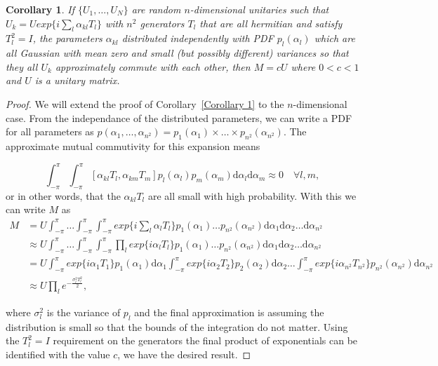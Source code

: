 \documentclass[aps,pra,twocolumn,superscriptaddress,numerical]{revtex4-1}
\newtheorem{corollary}{Corollary}
\begin{document}
\begin{corollary}
\label{Corollary 2}
If $\{U_1,\ldots,U_N\}$ are random $n$-dimensional unitaries such that $U_k = U exp\{i \sum_l \alpha_{kl} T_l\}$ with $n^2$ generators $T_l$ that are all hermitian and satisfy $T_l^2=I$, the parameters $\alpha_{kl}$ distributed independently with PDF $p_{l}(\alpha_l)$ which are all Gaussian with mean zero and small (but possibly different) variances so that they all $U_k$ approximately commute with each other, then $M = c U$ where $0 < c < 1$ and $U$ is a unitary matrix.
\end{corollary}
\begin{proof}
We will extend the proof of Corollary~\ref{Corollary 1} to the $n$-dimensional case.  From the independance of the distributed parameters, we can write a PDF for all parameters as $p(\alpha_1,\ldots,\alpha_{n^{2}}) = p_1(\alpha_1)\times\ldots\times p_{n^2}(\alpha_{n^{2}})$.  
The approximate mutual commutivity for this expansion means 
\begin{widetext}
\newcommand{\theint}{\int^\pi_{-\pi} \ldots \int^\pi_{-\pi} \int^\pi_{-\pi}}
\newcommand{\theintd}{\mathrm{d}\alpha_1 \mathrm{d}\alpha_2 \ldots \mathrm{d}\alpha_{n^{2}}}
\begin{equation}
	\int^\pi_{-\pi} \int^\pi_{-\pi}
	[\alpha_{kl}T_{l},\alpha_{km}T_{m}] p_l(\alpha_l)p_m(\alpha_m) \mathrm{d}\alpha_l \mathrm{d}\alpha_m \approx 0 \quad \forall l,m,
\end{equation}
or in other words, that the $\alpha_{kl}T_l$ are all small with high probability.  With this we can write $M$ as
\begin{align}
	M &= U \theint
	exp\{i \sum_l \alpha_{l} T_l\} p_1(\alpha_1)\ldots p_{n^2}(\alpha_{n^{2}})
	\theintd
	\label{eq:general integral form} \\
	&\approx U \theint
	\prod_{l}exp\{i \alpha_{l} T_l\}p_1(\alpha_1)\ldots p_{n^2}(\alpha_{n^{2}})
	\theintd  \\
	&= U\int^\pi_{-\pi} exp\{i \alpha_{1} T_1\}p_1(\alpha_1) \mathrm{d}\alpha_1 	\int^\pi_{-\pi} exp\{i \alpha_{2} T_2\}p_2(\alpha_2) \mathrm{d}\alpha_2 \ldots \int^\pi_{-\pi}
	exp\{i \alpha_{n^2} T_{n^2}\}p_{n^2}(\alpha_{n^2}) \mathrm{d}\alpha_{n^2} \\
	&\approx U \prod_l e^{-\frac{\sigma_l^2 T_l^2}{2}},
\end{align}
\end{widetext}
where $\sigma_l^2$ is the variance of $p_l$ and the final approximation is assuming the distribution is small so that the bounds of the integration do not matter.  Using the $T_l^2=I$ requirement on the generators the final product of exponentials can be identified with the value $c$, we have the desired result.
\end{proof}
\end{document}
